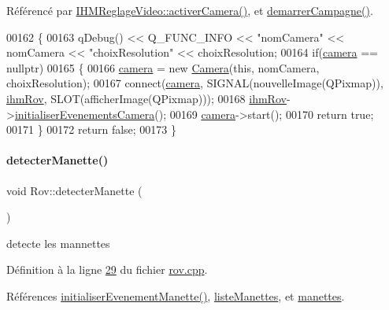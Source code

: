 Référencé par \hyperlink{ihmreglagevideo_8cpp_source_l00203}{I\+H\+M\+Reglage\+Video\+::activer\+Camera()}, et \hyperlink{rov_8cpp_source_l00123}{demarrer\+Campagne()}.


\begin{DoxyCode}
00162 \{
00163     qDebug() << Q\_FUNC\_INFO << \textcolor{stringliteral}{"nomCamera"} << nomCamera << \textcolor{stringliteral}{"choixResolution"} << choixResolution;
00164     \textcolor{keywordflow}{if}(\hyperlink{class_rov_ad0461ecece812497ee9b4a962f168c18}{camera} == \textcolor{keyword}{nullptr})
00165     \{
00166         \hyperlink{class_rov_ad0461ecece812497ee9b4a962f168c18}{camera} = \textcolor{keyword}{new} \hyperlink{class_camera}{Camera}(\textcolor{keyword}{this}, nomCamera, choixResolution);
00167         connect(\hyperlink{class_rov_ad0461ecece812497ee9b4a962f168c18}{camera}, SIGNAL(nouvelleImage(QPixmap)), \hyperlink{class_rov_a9b1c1c3b4e268a32e69b2ea4c863b817}{ihmRov}, SLOT(afficherImage(QPixmap)));
00168         \hyperlink{class_rov_a9b1c1c3b4e268a32e69b2ea4c863b817}{ihmRov}->\hyperlink{class_i_h_m_rov_a955daa231d959666fa7ed01346b2b6ef}{initialiserEvenementsCamera}();
00169         \hyperlink{class_rov_ad0461ecece812497ee9b4a962f168c18}{camera}->start();
00170         \textcolor{keywordflow}{return} \textcolor{keyword}{true};
00171     \}
00172     \textcolor{keywordflow}{return} \textcolor{keyword}{false};
00173 \}
\end{DoxyCode}
\mbox{\label{class_rov_a53979bc347cda7cc30d18324f2146be1}} 
\paragraph{\texorpdfstring{detecter\+Manette()}{detecterManette()}}
{\footnotesize\ttfamily void Rov\+::detecter\+Manette (\begin{DoxyParamCaption}{ }\end{DoxyParamCaption})\hspace{0.3cm}{\ttfamily [private]}}



detecte les mannettes 



Définition à la ligne \hyperlink{rov_8cpp_source_l00029}{29} du fichier \hyperlink{rov_8cpp_source}{rov.\+cpp}.



Références \hyperlink{rov_8cpp_source_l00052}{initialiser\+Evenement\+Manette()}, \hyperlink{rov_8h_source_l00098}{liste\+Manettes}, et \hyperlink{rov_8h_source_l00099}{manettes}.



